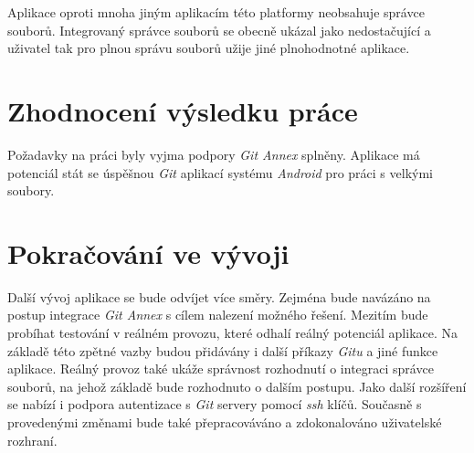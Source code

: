 Aplikace oproti mnoha jiným aplikacím této platformy neobsahuje správce souborů. Integrovaný správce souborů se obecně ukázal jako nedostačující a uživatel tak pro plnou správu souborů užije jiné plnohodnotné aplikace.

\section{Zhodnocení výsledku práce}
Požadavky na práci byly vyjma podpory \emph{Git Annex} splněny. Aplikace má potenciál stát se úspěšnou \emph{Git} aplikací systému \emph{Android} pro práci s velkými soubory.

\section{Pokračování ve vývoji}
Další vývoj aplikace se bude odvíjet více směry. Zejména bude navázáno na postup integrace \emph{Git Annex} s cílem nalezení možného řešení. Mezitím bude probíhat testování v reálném provozu, které odhalí reálný potenciál aplikace. Na základě této zpětné vazby budou přidávány i další příkazy \emph{Gitu} a jiné funkce aplikace. Reálný provoz také ukáže správnost rozhodnutí o integraci správce souborů, na jehož základě bude rozhodnuto o dalším postupu. Jako další rozšíření se nabízí i podpora autentizace s \emph{Git} servery pomocí \emph{ssh} klíčů. Současně s provedenými změnami bude také přepracováváno a zdokonalováno uživatelské rozhraní.

